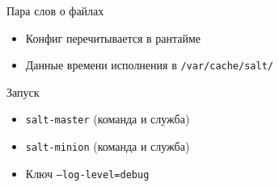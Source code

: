 \begin{Frame}{Пара слов о файлах}
  \begin{itemize}[<+-| alert@ +>]
    \item[\faSync] Конфиг перечитывается в рантайме
    \item[\faFolder] Данные времени исполнения в \texttt{/var/cache/salt/}
  \end{itemize}
\end{Frame}

\begin{Frame}{Запуск}
  \begin{itemize}[<+-| alert@ +>]
    \vfill
    \item \texttt{salt-master} (команда и служба)\vfill
    \item \texttt{salt-minion} (команда и служба)\vfill
    \item[\faBug] Ключ \texttt{--log-level=debug}
    \vfill
  \end{itemize}

\end{Frame}
